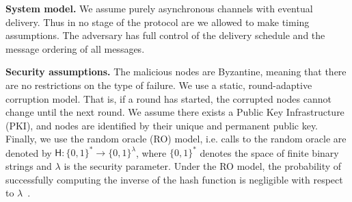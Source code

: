 \textbf{System model.\quad}
We assume purely asynchronous channels with eventual delivery.
Thus in no stage of the protocol are we allowed to make timing assumptions.
The adversary has full control of the delivery schedule and the message ordering of all messages.

\textbf{Security assumptions.\quad}
The malicious nodes are Byzantine,
meaning that there are no restrictions on the type of failure.
We use a static, round-adaptive corruption model.
That is, if a round has started, the corrupted nodes cannot change until the next round.
We assume there exists a Public Key Infrastructure (PKI), and nodes are identified by their unique and permanent public key.
Finally, we use the random oracle (RO) model, i.e. calls to the random oracle are denoted by $\textsf{H}: \{0, 1\}^* \rightarrow \{0, 1\}^\lambda$,
where $\{0, 1\}^*$ denotes the space of finite binary strings and $\lambda$ is the security parameter.
Under the RO model, the probability of successfully computing the inverse of the hash function is negligible with respect to $\lambda$~\cite{bellare1993random}.

